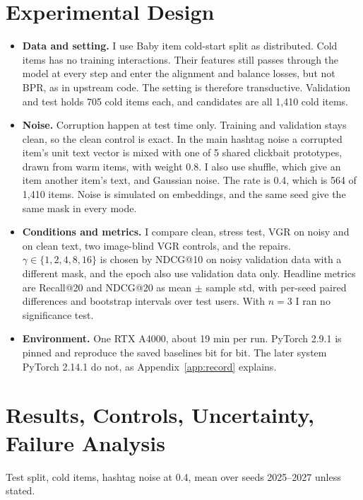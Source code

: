 \documentclass[conference]{IEEEtran}
\begin{document}
\section{Experimental Design}
\label{sec:design}

\begin{itemize}
\item \textbf{Data and setting.} I use Baby item cold-start split as distributed. Cold items has no training interactions. Their features still passes through the model at every step and enter the alignment and balance losses, but not BPR, as in upstream code. The setting is therefore transductive. Validation and test holds 705 cold items each, and candidates are all 1,410 cold items.
\item \textbf{Noise.} Corruption happen at test time only. Training and validation stays clean, so the clean control is exact. In the main hashtag noise a corrupted item's unit text vector is mixed with one of 5 shared clickbait prototypes, drawn from warm items, with weight 0.8. I also use shuffle, which give an item another item's text, and Gaussian noise. The rate is 0.4, which is 564 of 1,410 items. Noise is simulated on embeddings, and the same seed give the same mask in every mode.
\item \textbf{Conditions and metrics.} I compare clean, stress test, VGR on noisy and on clean text, two image-blind VGR controls, and the repairs. $\gamma\in\{1,2,4,8,16\}$ is chosen by NDCG@10 on noisy validation data with a different mask, and the epoch also use validation data only. Headline metrics are Recall@20 and NDCG@20 as mean $\pm$ sample std, with per-seed paired differences and bootstrap intervals over test users. With $n=3$ I ran no significance test.
\item \textbf{Environment.} One RTX A4000, about 19 min per run. PyTorch 2.9.1 is pinned and reproduce the saved baselines bit for bit. The later system PyTorch 2.14.1 do not, as Appendix~\ref{app:record} explains.
\end{itemize}

\section{Results, Controls, Uncertainty, Failure Analysis}
\label{sec:results}

Test split, cold items, hashtag noise at 0.4, mean over seeds 2025--2027 unless stated.
\end{document}
